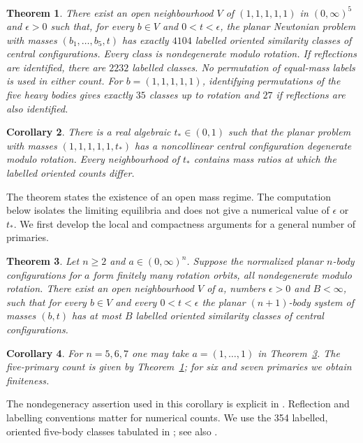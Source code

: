 \documentclass[11pt]{article}
\newtheorem{theorem}{Theorem}
\newtheorem{corollary}[theorem]{Corollary}
\begin{document}
\begin{theorem}\label{counttheorem}
There exist an open neighbourhood $V$ of $(1,1,1,1,1)$ in $(0,\infty)^5$ and $\epsilon>0$ such that, for every $b\in V$ and $0<t<\epsilon$, the planar Newtonian problem with masses $(b_1,\dots,b_5,t)$ has exactly $4104$ labelled oriented similarity classes of central configurations. Every class is nondegenerate modulo rotation. If reflections are identified, there are $2232$ labelled classes. No permutation of equal-mass labels is used in either count. For $b=(1,1,1,1,1)$, identifying permutations of the five heavy bodies gives exactly $35$ classes up to rotation and $27$ if reflections are also identified.
\end{theorem}

\begin{corollary}\label{degen}
There is a real algebraic $t_*\in(0,1)$ such that the planar problem with masses $(1,1,1,1,1,t_*)$ has a noncollinear central configuration degenerate modulo rotation. Every neighbourhood of $t_*$ contains mass ratios at which the labelled oriented counts differ.
\end{corollary}
The theorem states the existence of an open mass regime. The computation below isolates the limiting equilibria and does not give a numerical value of $\epsilon$ or $t_*$. We first develop the local and compactness arguments for a general number of primaries.
\begin{theorem}\label{main}
Let $n\ge2$ and $a\in(0,\infty)^n$. Suppose the normalized planar $n$-body configurations for $a$ form finitely many rotation orbits, all nondegenerate modulo rotation. There exist an open neighbourhood $V$ of $a$, numbers $\epsilon>0$ and $B<\infty$, such that for every $b\in V$ and every $0<t<\epsilon$ the planar $(n+1)$-body system of masses $(b,t)$ has at most $B$ labelled oriented similarity classes of central configurations.
\end{theorem}

\begin{corollary}\label{equalcor}
For $n=5,6,7$ one may take $a=(1,\ldots,1)$ in Theorem~\ref{main}. The five-primary count is given by Theorem~\ref{counttheorem}; for six and seven primaries we obtain finiteness.
\end{corollary}
The nondegeneracy assertion used in this corollary is explicit in \cite[Theorem 1 and end of Sect.~5.2]{equal}. Reflection and labelling conventions matter for numerical counts. We use the 354 labelled, oriented five-body classes tabulated in \cite[Table 3]{near}; see also \cite{count}.
\end{document}
